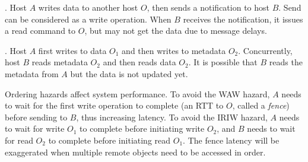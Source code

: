.
Host $A$ writes data to another host $O$, then sends a notification to host $B$. Send can be considered as a write operation.
When $B$ receives the notification, it issues a read command to $O$, but may not get the data due to message delays.

.
Host $A$ first writes to data $O_1$ and then writes to metadata $O_2$. Concurrently, host $B$ reads metadata $O_2$ and then reads data $O_2$.
It is possible that $B$ reads the metadata from $A$ but the data is not updated yet.



Ordering hazards affect system performance. To avoid the WAW hazard, $A$ needs to wait for the first write operation to complete (an RTT to $O$, called a \emph{fence}) before sending to $B$, thus increasing latency. To avoid the IRIW hazard, $A$ needs to wait for write $O_1$ to complete before initiating write $O_2$, and $B$ needs to wait for read $O_2$ to complete before initiating read $O_1$. The fence latency will be exaggerated when multiple remote objects need to be accessed in order.



